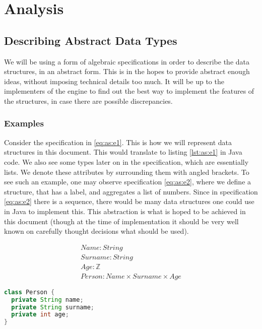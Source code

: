 \section{Analysis}

\subsection{Describing Abstract Data Types}

We will be using a form of algebraic specifications in order to describe the
data structures, in an abstract form. This is in the hopes to provide abstract
enough ideas, without imposing technical details too much. It will be up to the
implementers of the engine to find out the best way to implement the features
of the structures, in case there are possible discrepancies.

\subsubsection{Examples}

Consider the specification in \ref{eq:as:e1}. This is how we will represent
data structures in this document. This would translate to listing \ref{lst:as:e1}
in Java code. We also see some types later on in the specification, which are
essentially lists. We denote these attributes by surrounding them with angled
brackets. To see such an example, one may observe specification \ref{eq:as:e2},
where we define a structure, that has a label, and aggregates a list of numbers.
Since in specification \ref{eq:as:e2} there is a sequence, there would be many
data structures one could use in Java to implement this. This abstraction is
what is hoped to be achieved in this document (though at the time of 
implementation it should be very well known on carefully thought decisions 
what should be used).

\begin{equation}
\label{eq:as:e1}
\begin{split}
Name\colon String \\
Surname\colon String \\
Age\colon \mathbb{Z} \\
Person\colon Name \times Surname \times Age
\end{split}
\end{equation}

\begin{lstlisting}[caption=Representing the algebraic specification in Java
                  ,language=Java,label=lst:as:e1]
class Person {
  private String name;
  private String surname;
  private int age;
}
\end{lstlisting}

